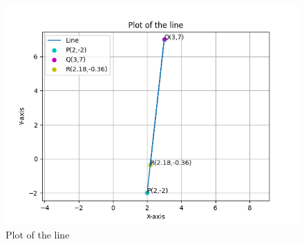 \documentclass[journal]{IEEEtran}
\begin{document}
\begin{figure}[h!]
   \centering
   \includegraphics[width=0.7\linewidth]{figs/fig.png}
   \caption{Plot of the line}
   \label{stemplot}
\end{figure}
\end{document}
